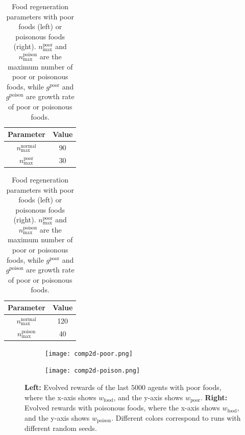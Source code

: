 \begin{table}[t]
  \begin{subtable}[h]{0.45\columnwidth}
    \centering
    \begin{tabular}{cc}
      \toprule
      Parameter & Value \\
      \midrule
      $n_{\textrm{max}}^{\textrm{normal}}$ & 90 \\
      $n_{\textrm{max}}^{\textrm{poor}}$ & 30 \\
      \bottomrule
    \end{tabular}
  \end{subtable}
  \begin{subtable}[h]{0.45\columnwidth}
    \centering
    \begin{tabular}{cc}
      \toprule
      Parameter & Value \\
      \midrule
      $n_{\textrm{max}}^{\textrm{normal}}$ & 120 \\
      $n_{\textrm{max}}^{\textrm{poison}}$ & 40 \\
      \bottomrule
    \end{tabular}
  \end{subtable}
  \caption{
    Food regeneration parameters with poor foods (left) or poisonous foods (right).
    $n_{\textrm{max}}^{\textrm{poor}}$ and $n_{\textrm{max}}^{\textrm{poison}}$ are the maximum number of poor or poisonous foods, while $g^{\textrm{poor}}$ and $g^{\textrm{poison}}$ are growth rate of poor or poisonous foods.
  }\label{table:pp}
\end{table}

\begin{figure}[t]
  \begin{subfigure}[t]{4cm}
    \centering
    \texttt{[image: comp2d-poor.png]}
  \end{subfigure}
  \begin{subfigure}[t]{3.5cm}
    \centering
    \texttt{[image: comp2d-poison.png]}
  \end{subfigure}
  \caption{
    \textbf{Left:} Evolved rewards of the last $5000$ agents with poor foods, where the x-axis shows $w_{\mathrm{food}}$, and the y-axis shows $w_{\mathrm{poor}}$.
    \textbf{Right:} Evolved rewards with poisonous foods, where the x-axis shows $w_{\mathrm{food}}$, and the y-axis shows $w_{\mathrm{poison}}$.
    Different colors correspond to runs with different random seeds.
  }\label{figure:result-pp}
\end{figure}

